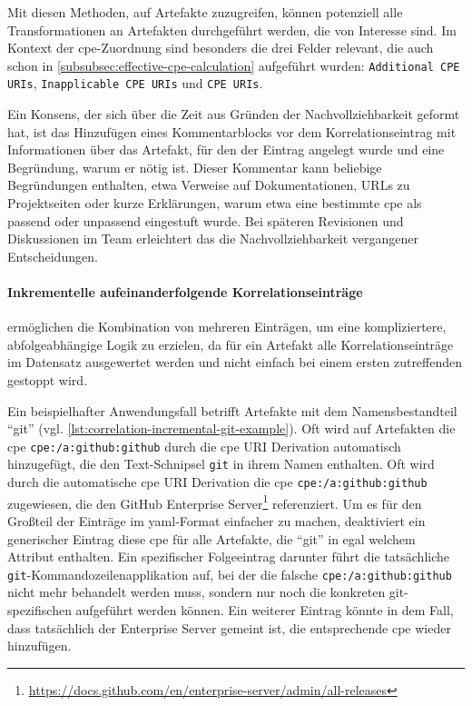\bigskip

Mit diesen Methoden, auf Artefakte zuzugreifen, können potenziell alle Transformationen an Artefakten durchgeführt werden, die von Interesse sind.
Im Kontext der \acrshort{cpe}-Zuordnung sind besonders die drei Felder relevant, die auch schon in \autoref{subsubsec:effective-cpe-calculation} aufgeführt wurden:
\texttt{Additional CPE URIs}, \texttt{Inapplicable CPE URIs} und \texttt{CPE URIs}.

Ein Konsens, der sich über die Zeit aus Gründen der Nachvollziehbarkeit geformt hat, ist das Hinzufügen eines Kommentarblocks vor dem Korrelationseintrag mit Informationen über das Artefakt, für den der Eintrag angelegt wurde und eine Begründung, warum er nötig ist.
Dieser Kommentar kann beliebige Begründungen enthalten, etwa Verweise auf Dokumentationen, URLs zu Projektseiten oder kurze Erklärungen, warum etwa eine bestimmte \acrshort{cpe} als passend oder unpassend eingestuft wurde.
Bei späteren Revisionen und Diskussionen im Team erleichtert das die Nachvollziehbarkeit vergangener Entscheidungen.

\paragraph{Inkrementelle aufeinanderfolgende Korrelationseinträge}\label{par:incremental-correlation-entries}
ermöglichen die Kombination von mehreren Einträgen, um eine kompliziertere, abfolgeabhängige Logik zu erzielen, da für ein Artefakt alle Korrelationseinträge im Datensatz ausgewertet werden und nicht einfach bei einem ersten zutreffenden gestoppt wird.

Ein beispielhafter Anwendungsfall betrifft Artefakte mit dem Namensbestandteil \enquote{git} (vgl. \autoref{lst:correlation-incremental-git-example}).
Oft wird auf Artefakten die \acrshort{cpe} \texttt{cpe:/a:github:github} durch die \acrshort{cpe} URI Derivation automatisch hinzugefügt, die den Text-Schnipsel \texttt{git} in ihrem Namen enthalten.
Oft wird durch die automatische \acrshort{cpe} URI Derivation die \acrshort{cpe} \texttt{cpe:/a:github:github} zugewiesen, die den GitHub Enterprise Server\footnote{\url{https://docs.github.com/en/enterprise-server/admin/all-releases}} referenziert.
Um es für den Großteil der Einträge im \acrshort{yaml}-Format einfacher zu machen, deaktiviert ein generischer Eintrag diese \acrshort{cpe} für alle Artefakte, die \enquote{git} in egal welchem Attribut enthalten.
Ein spezifischer Folgeeintrag darunter führt die tatsächliche \texttt{git}-Kommandozeilenapplikation auf, bei der die falsche \texttt{cpe:/a:github:github} nicht mehr behandelt werden muss, sondern nur noch die konkreten git-spezifischen  aufgeführt werden können.
Ein weiterer Eintrag könnte in dem Fall, dass tatsächlich der Enterprise Server gemeint ist, die entsprechende \acrshort{cpe} wieder hinzufügen.


